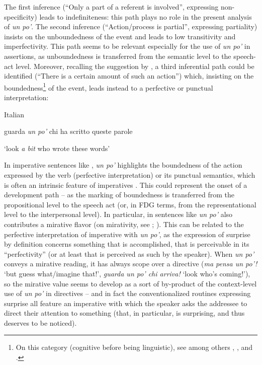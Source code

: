 The first inference (“Only a part of a referent is involved”, expressing non-specificity) leads to indefiniteness: this path plays no role in the present analysis of \textit{un po’}. The second inference (“Action/process is partial”, expressing partiality) insists on the unboundedness of the event and leads to low transitivity and imperfectivity. This path seems to be relevant especially for the use of \textit{un po’} in assertions, as unboundedness is transferred from the semantic level to the speech-act level. Moreover, recalling the suggestion by \citet{Budd2014}, a third inferential path could be identified (“There is a certain amount of such an action”) which, insisting on the boundedness\footnote{On this category (cognitive before being linguistic), see among others \citet{Declerck1979}, \citet{Dahl1981}, \citet{Jackendoff1991} and \citet{Brinton1998a}.} of the event, leads instead to a perfective or punctual interpretation:

\ea%
    \label{ex:key:64}

           Italian

guarda \textit{un po’} chi ha scritto queste parole

\glt ‘look \textit{a bit} who wrote these words’
\z

In imperative sentences like , \textit{un po’} highlights the boundedness of the action expressed by the verb (perfective interpretation) or its punctual semantics, which is often an intrinsic feature of imperatives \citep[126]{Aikhenvald2010}. This could represent the onset of a development path – as the marking of boundedness is transferred from the propositional level to the speech act (or, in FDG terms, from the representational level to the interpersonal level). In particular, in sentences like  \textit{un po’} also contributes a mirative flavor (on mirativity, see \citealt{Delancey1997}; \citealt{HengeveldOlbertz2012}). This can be related to the perfective interpretation of imperative with \textit{un po’}, as the expression of surprise by definition concerns something that is accomplished, that is perceivable in its “perfectivity” (or at least that is perceived as such by the speaker). When \textit{un po’} conveys a mirative reading, it has always scope over a directive (\textit{ma pensa un po’!} ‘but guess what/imagine that!’, \textit{guarda un po’ chi arriva!} ‘look who’s coming!’), so the mirative value seems to develop as a sort of by-product of the context-level use of \textit{un po’} in directives – and in fact the conventionalized routines expressing surprise all feature an imperative with which the speaker asks the addressee to direct their attention to something (that, in particular, is surprising, and thus deserves to be noticed).

